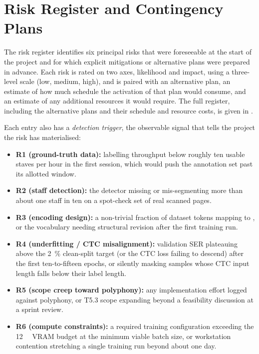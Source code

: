 \section{Risk Register and Contingency Plans}
\label{sec:mgmt-risks}

The risk register identifies six principal risks that were
foreseeable at the start of the project and for which explicit
mitigations or alternative plans were prepared in advance.
Each risk is rated on two axes, likelihood and impact, using a
three-level scale (low, medium, high), and is paired with an
alternative plan, an estimate of how much schedule the activation
of that plan would consume, and an estimate of any additional
resources it would require.
The full register, including the alternative plans and their
schedule and resource costs, is given in .

Each entry also has a \emph{detection trigger}, the observable
signal that tells the project the risk has materialised:
\begin{itemize}
    \item \textbf{R1 (ground-truth data):} labelling throughput below
    roughly ten usable staves per hour in the first session, which
    would push the annotation set past its allotted window.
    \item \textbf{R2 (staff detection):} the detector missing or
    mis-segmenting more than about one staff in ten on a spot-check
    set of real scanned pages.
    \item \textbf{R3 (encoding design):} a non-trivial fraction of
    dataset tokens mapping to , or the vocabulary needing
    structural revision after the first training run.
    \item \textbf{R4 (underfitting / CTC misalignment):} validation
    SER plateauing above the \SI{2}{\percent} clean-split target (or
    the CTC loss failing to descend) after the first ten-to-fifteen
    epochs, or  silently masking samples whose
    CTC input length falls below their label length.
    \item \textbf{R5 (scope creep toward polyphony):} any
    implementation effort logged against polyphony, or T5.3 scope
    expanding beyond a feasibility discussion at a sprint review.
    \item \textbf{R6 (compute constraints):} a required training
    configuration exceeding the \SI{12}{\giga\byte} VRAM budget at the
    minimum viable batch size, or workstation contention stretching a
    single training run beyond about one day.
\end{itemize}

